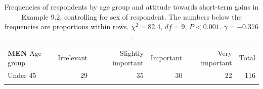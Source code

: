 \documentclass[11pt,a4paper,openany]{book}
\begin{document}
\begin{longtable}[]{@{}lrrrrr@{}}
\caption{\label{tab:t-investors3} Frequencies of respondents by age group
and attitude towards short-term gains in Example 9.2, controlling for
sex of respondent. The numbers below the frequencies are proportions
within rows. \(\chi^{2}=82.4\), \(df=9\), \(P<0.001\).
\(\gamma=-0.376\).}\tabularnewline
\toprule
\begin{minipage}[t]{0.30\columnwidth}\raggedright\strut
\textbf{MEN} Age group\strut
\end{minipage} & \begin{minipage}[t]{0.30\columnwidth}\raggedleft\strut
Irrelevant\strut
\end{minipage} & \begin{minipage}[t]{0.06\columnwidth}\raggedleft\strut
Slightly important\strut
\end{minipage} & \begin{minipage}[t]{0.06\columnwidth}\raggedleft\strut
Important\strut
\end{minipage} & \begin{minipage}[t]{0.06\columnwidth}\raggedleft\strut
Very important\strut
\end{minipage} & \begin{minipage}[t]{0.04\columnwidth}\raggedleft\strut
Total\strut
\end{minipage}\tabularnewline
\begin{minipage}[t]{0.30\columnwidth}\raggedright\strut
Under 45\strut
\end{minipage} & \begin{minipage}[t]{0.30\columnwidth}\raggedleft\strut
29\strut
\end{minipage} & \begin{minipage}[t]{0.06\columnwidth}\raggedleft\strut
35\strut
\end{minipage} & \begin{minipage}[t]{0.06\columnwidth}\raggedleft\strut
30\strut
\end{minipage} & \begin{minipage}[t]{0.06\columnwidth}\raggedleft\strut
22\strut
\end{minipage} & \begin{minipage}[t]{0.04\columnwidth}\raggedleft\strut
116\strut
\end{minipage}\tabularnewline
\begin{minipage}[t]{0.30\columnwidth}\raggedright\strut
\strut
\end{minipage} & \begin{minipage}[t]{0.30\columnwidth}\raggedleft\strut

\end{minipage}
\end{longtable}
\end{document}
